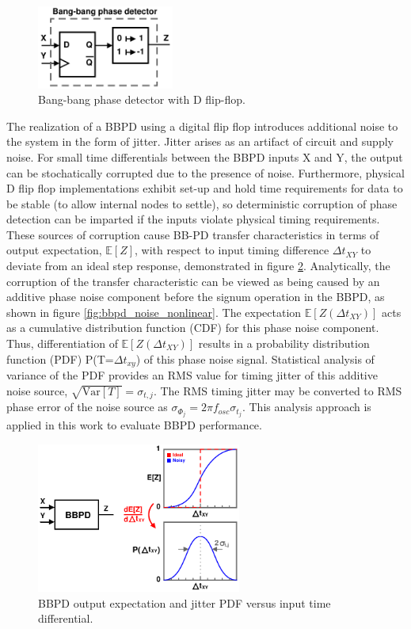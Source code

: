 		\begin{figure}[htb!]
			\center\includegraphics[width=0.4\textwidth, angle=0]{./figs/design/bbpd_}
			\caption{Bang-bang phase detector with D flip-flop.}
			\label{fig:bbpd_dff}
		\end{figure}
		The realization of a BBPD using a digital flip flop introduces additional noise to the system in the form of jitter. Jitter arises as an artifact of circuit and supply noise. For small time differentials between the BBPD inputs X and Y, the output can be stochatically corrupted due to the presence of noise. Furthermore, physical D flip flop implementations exhibit set-up and hold time requirements for data to be stable (to allow internal nodes to settle), so deterministic corruption of phase detection can be imparted if the inputs violate physical timing requirements. These sources of corruption cause BB-PD transfer characteristics in terms of output expectation, $\mathbb{E}[Z]$, with respect to input timing difference $\Delta t_{XY}$ to deviate from an ideal step response, demonstrated in figure \ref{fig:bbpd_jit_pdf}. Analytically, the corruption of the transfer characteristic can be viewed as being caused by an additive phase noise component before the signum operation in the BBPD, as shown in figure \ref{fig:bbpd_noise_nonlinear}. The expectation $\mathbb{E}[Z(\Delta t_{XY})]$ acts as a cumulative distribution function (CDF) for this phase noise component. Thus, differentiation of $\mathbb{E}[Z(\Delta t_{XY})]$ results in a probability distribution function (PDF) P(T=$\Delta t_{xy}$) of this phase noise signal. Statistical analysis of variance of the PDF provides an RMS value for timing jitter of this additive noise source, $\sqrt{\mathrm{Var}[T]} = \sigma_{t,j}$. The RMS timing jitter may be converted to RMS phase error of the noise source as $\sigma_{\Phi_j} = 2\pi f_{osc}\sigma_{t_j}$. This analysis approach is applied in this work to evaluate BBPD performance.
 
		\begin{figure}[htb!]
		    \centering
			\includegraphics[width=0.6\textwidth, angle=0]{./figs/bbpd_jitter.pdf}
			\caption{BBPD output expectation and jitter PDF versus input time differential.}
			\label{fig:bbpd_jit_pdf}
		\end{figure}

